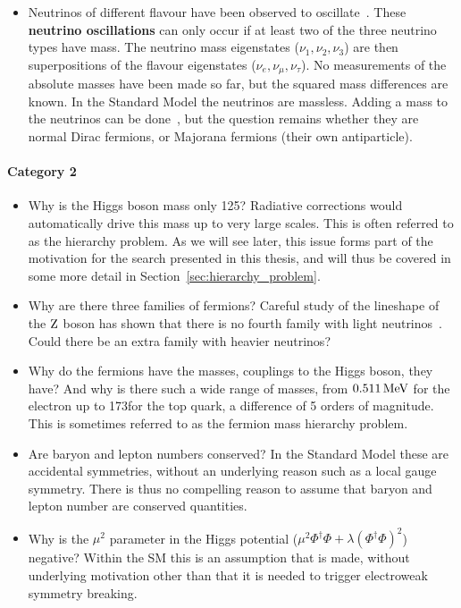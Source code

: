 \begin{itemize}
  \item Neutrinos of different flavour have been observed to
oscillate~\cite{Abe:2008aa,Abe:2014ugx,Agafonova:2014ptn}. These \textbf{neutrino oscillations} can
only occur if at least two of the three neutrino types have mass. The neutrino mass eigenstates
($\nu_1, \nu_2, \nu_3$) are then superpositions of the flavour eigenstates ($\nu_e, \nu_\mu,
\nu_\tau$).
No measurements of the absolute masses have been made so far, but the squared mass differences are
known. 
In the Standard Model the neutrinos are massless. Adding a mass to the neutrinos can be
done~\cite{Klinkhamer:2011aa}, but the question remains whether they are normal Dirac fermions, or
Majorana fermions (\ie their own antiparticle). 
\end{itemize}

\paragraph{Category 2}

\begin{itemize}
  \item Why is the Higgs boson mass only 125\GeV? Radiative corrections would automatically drive
this mass up to very large scales. This is often referred to as the hierarchy problem.
As we will see later, this issue forms part of the motivation for the search presented in this
thesis, and will thus be covered in some more detail in Section~\ref{sec:hierarchy_problem}. 

  \item Why are there three families of fermions? Careful study of the lineshape of the $\mathrm{Z}$
boson has shown that there is no fourth family with light neutrinos~\cite{Decamp:1989fr}. Could
there be an extra family with heavier neutrinos?

  \item Why do the fermions have the masses, \ie couplings to the Higgs boson, they have? And why
is there such a wide range of masses, \ie from $0.511\,\text{Me\hspace{-.08em}V}$ for the electron up to 173\GeV for the
top quark, a difference of 5 orders of magnitude. This is sometimes referred to as the fermion mass
hierarchy problem. 

  \item Are baryon and lepton numbers conserved? In the Standard Model these are accidental
symmetries, without an underlying reason such as a local gauge symmetry. There is thus no
compelling reason to assume that baryon and lepton number are conserved quantities. 
  
  \item Why is the $\mu^2$ parameter in the Higgs potential ($\mu^2 \Phi^\dagger \Phi + \lambda
(\Phi^\dagger \Phi)^2$) negative? Within the SM this is an assumption that is made, without
underlying motivation other than that it is needed to trigger electroweak symmetry breaking.
\end{itemize}


